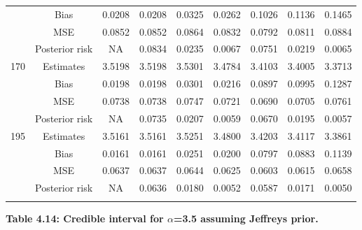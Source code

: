 \documentclass[a4paper,12pt]{report}
\begin{document}
{\begin{minipage}{\linewidth}
{\begin{tabular}{|c|c|c|c|c|c|c|c|c|}
			&Bias           &0.0208 &0.0208 &0.0325 &0.0262 &0.1026 &0.1136 &0.1465 \\
			&MSE            &0.0852 &0.0852 &0.0864 &0.0832 &0.0792 &0.0811 &0.0884 \\
			&Posterior risk    &NA &0.0834 &0.0235 &0.0067 &0.0751 &0.0219 &0.0065 \\ \hline
			170		&Estimates      &3.5198 &3.5198 &3.5301 &3.4784 &3.4103 &3.4005 &3.3713 \\
			&Bias           &0.0198 &0.0198 &0.0301 &0.0216 &0.0897 &0.0995 &0.1287 \\
			&MSE            &0.0738 &0.0738 &0.0747 &0.0721 &0.0690 &0.0705 &0.0761 \\
			&Posterior risk    &NA &0.0735 &0.0207 &0.0059 &0.0670 &0.0195 &0.0057 \\ \hline
			195		&Estimates      &3.5161 &3.5161 &3.5251 &3.4800 &3.4203 &3.4117 &3.3861 \\
			&Bias           &0.0161 &0.0161 &0.0251 &0.0200 &0.0797 &0.0883 &0.1139 \\
			&MSE            &0.0637 &0.0637 &0.0644 &0.0625 &0.0603 &0.0615 &0.0658 \\
			&Posterior risk    &NA &0.0636 &0.0180 &0.0052 &0.0587 &0.0171 &0.0050 \\ \hline
			\ECC
		\end{tabular}
	}
\end{minipage}

\newpage
{\noindent\small\textbf{Table 4.14: Credible interval for $\alpha$=3.5 assuming Jeffreys prior.}\\}

}
\end{document}

